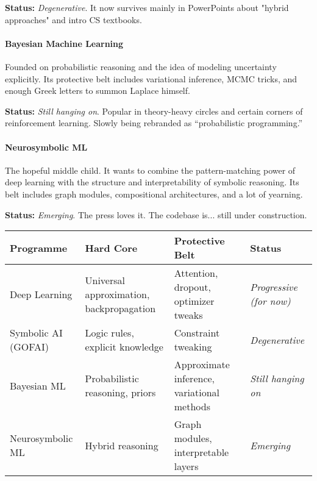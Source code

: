 \textbf{Status:} \textit{Degenerative}. It now survives mainly in PowerPoints about "hybrid approaches" and intro CS textbooks.

\paragraph{Bayesian Machine Learning}  
Founded on probabilistic reasoning and the idea of modeling uncertainty explicitly. Its protective belt includes variational inference, MCMC tricks, and enough Greek letters to summon Laplace himself.

\textbf{Status:} \textit{Still hanging on}. Popular in theory-heavy circles and certain corners of reinforcement learning. Slowly being rebranded as “probabilistic programming.”

\paragraph{Neurosymbolic ML}  
The hopeful middle child. It wants to combine the pattern-matching power of deep learning with the structure and interpretability of symbolic reasoning. Its belt includes graph modules, compositional architectures, and a lot of yearning.

\textbf{Status:} \textit{Emerging}. The press loves it. The codebase is... still under construction.

\bigskip

\begin{tcolorbox}[colback=gray!5!white, colframe=black, title=\textbf{Sidebar: ML Research Programmes in Lakatosian Terms}, fonttitle=\bfseries, arc=1.5mm, boxrule=0.4pt]
\begin{tabular}{|p{3.5cm}|p{4cm}|p{5.5cm}|p{3cm}|}
\hline
\textbf{Programme} & \textbf{Hard Core} & \textbf{Protective Belt} & \textbf{Status} \\
\hline
Deep Learning & Universal approximation, backpropagation & Attention, dropout, optimizer tweaks & \textit{Progressive (for now)} \\
\hline
Symbolic AI (GOFAI) & Logic rules, explicit knowledge & Constraint tweaking & \textit{Degenerative} \\
\hline
Bayesian ML & Probabilistic reasoning, priors & Approximate inference, variational methods & \textit{Still hanging on} \\
\hline
Neurosymbolic ML & Hybrid reasoning & Graph modules, interpretable layers & \textit{Emerging} \\
\hline
\end{tabular}
\end{tcolorbox}

